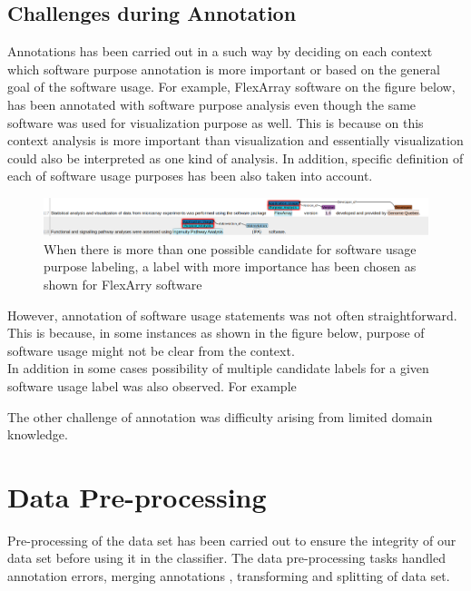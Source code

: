 \subsection{Challenges during Annotation }
\label{subsec:dataset:tool:Challenges}
Annotations has been carried out in a such way by deciding on each context which software purpose annotation is more important or based on the general goal of the software usage. For example, FlexArray software on the figure below, has been annotated with software purpose analysis even though the same software was used for visualization purpose as well. This is because on this context analysis is more important than visualization and essentially visualization could also be interpreted as one kind of analysis. In addition, specific definition of each of software usage purposes has been also taken into account. \\

\begin{figure}[htbp]
	\centering
	\includegraphics[width=.99\textwidth]{4.graphics/figures/chap4/annotation_confusions}
	\caption{When there is more than one possible candidate for software usage purpose labeling, a label with more importance has been chosen as shown for FlexArry software}
	\label{fig:chapter04:setup}
\end{figure}

However, annotation of software usage statements was not often straightforward. This is because, in some instances as shown in the figure below, purpose of software usage might not be clear from the context.\\

In addition in some cases possibility of multiple candidate labels for a given software usage label was also observed. For example  

The other challenge of annotation was difficulty arising from limited domain knowledge. 

\section{Data Pre-processing}
\label{sec:dataset:preprocessing}
Pre-processing of the data set has been carried out to ensure the integrity of our data set before using it in the classifier. The data pre-processing tasks handled annotation errors, merging annotations , transforming and splitting of data set. 

